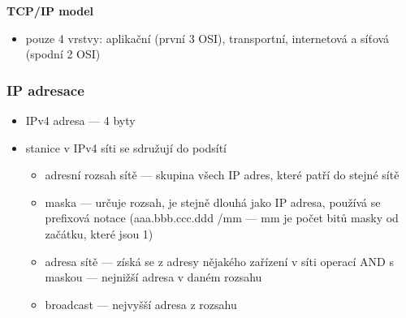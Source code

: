 \textbf{TCP/IP model}
\begin{itemize}
	\item pouze 4 vrstvy: aplikační (první 3 OSI), transportní, internetová a síťová (spodní 2 OSI)
\end{itemize}

\subsubsection*{IP adresace}
\begin{itemize}
	\item IPv4 adresa --- 4 byty
	\item stanice v IPv4 síti se sdružují do podsítí
	\begin{itemize}
		\item adresní rozsah sítě --- skupina všech IP adres, které patří do stejné sítě
		\item maska --- určuje rozsah, je stejně dlouhá jako IP adresa, používá se prefixová notace (aaa.bbb.ccc.ddd /mm --- mm je počet bitů masky od začátku, které jsou 1)
		\item adresa sítě --- získá se z adresy nějakého zařízení v síti operací AND s maskou --- nejnižší adresa v daném rozsahu
		\item broadcast --- nejvyšší adresa z rozsahu
	\end{itemize}
\end{itemize}

